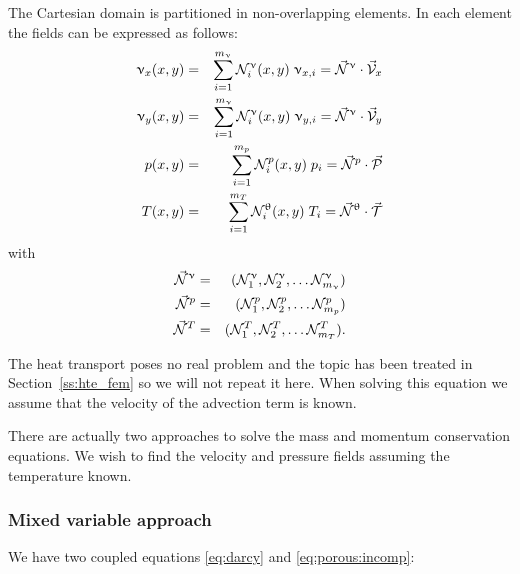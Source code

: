 The Cartesian domain is partitioned in non-overlapping elements. 
In each element the fields can be expressed as follows:
\begin{eqnarray}
\upnu_x(x,y) &=& \sum_{i=1}^{m_\upnu} {\mathcal{N}}_i^\upnu (x,y) \; \upnu_{x,i} = \vec{{\mathcal{N}}}^\upnu \cdot \vec{\cal V}_x \\
\upnu_y(x,y) &=& \sum_{i=1}^{m_\upnu} {\mathcal{N}}_i^\upnu (x,y) \; \upnu_{y,i} = \vec{{\mathcal{N}}}^\upnu \cdot \vec{\cal V}_y \\
p(x,y) &=& \sum_{i=1}^{m_p} {\mathcal{N}}_i^p(x,y) \; p_i 
= \vec{{\mathcal{N}}}^p \cdot \vec{\cal P} \\
T(x,y) &=& \sum_{i=1}^{m_T} {\mathcal{N}}_i^\uptheta (x,y) \; T_i
= \vec{{\mathcal{N}}}^\uptheta \cdot \vec{\cal T}
\end{eqnarray}
with
\begin{eqnarray}
\vec{{\mathcal{N}}}^\upnu &=& ({\mathcal{N}}^\upnu_1, {\mathcal{N}}^\upnu_2, \dots {\mathcal{N}}^\upnu_{m_\upnu}) \\
\vec{{\mathcal{N}}}^p &=& ({\mathcal{N}}^p_1, {\mathcal{N}}^p_2, \dots {\mathcal{N}}^p_{m_p}) \\
\vec{{\mathcal{N}}}^T &=& ({\mathcal{N}}^T_1, {\mathcal{N}}^T_2, \dots {\mathcal{N}}^T_{m_T}).
\end{eqnarray}

The heat transport poses no real problem and the topic has been treated in 
Section~\ref{ss:hte_fem} so we will not repeat it here. When solving this equation we assume that the velocity of the advection term is known.

There are actually two approaches to solve the mass and momentum conservation equations.
We wish to find the velocity and pressure fields assuming the temperature known. 

\subsubsection{Mixed variable approach}

We have two coupled equations \eqref{eq:darcy} and \eqref{eq:porous:incomp}:

